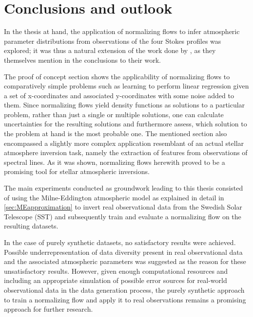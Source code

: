 \documentclass[a4paper,11pt]{report}
\def\lk#1{{\color{black}{#1}}}
\begin{document}
\FloatBarrier
\chapter{Conclusions and outlook}
\lk{In this last chapter, the main conclusions from the beforehand discussed material shall be recalled and summarized.}

In the thesis at hand, the application of normalizing flows to infer atmospheric parameter distributions from observations of the four Stokes profiles was explored; it was thus a natural extension of the work done by \cite{DiazBaso.2022}, as they themselves mention in the conclusions to their work.

The proof of concept section shows the applicability of normalizing flows to comparatively simple problems such as learning to perform linear regression given a set of x-coordinates and associated y-coordinates with some noise added to them. Since normalizing flows yield density functions as solutions to a particular problem, rather than just a single or multiple solutions, one can calculate uncertainties for the resulting solutions and furthermore assess, which solution to the problem at hand is the most probable one. The mentioned section also encompassed a slightly more complex application resemblant of an actual stellar atmosphere inversion task, namely the extraction of features from observations of spectral lines. As it was shown, normalizing flows herewith proved to be a promising tool for stellar atmospheric inversions.

The main experiments conducted as groundwork leading to this thesis consisted of using the Milne-Eddington atmospheric model as explained in detail in \cref{sec:MEapproximation} to invert real observational data from the Swedish Solar Telescope (SST) and subsequently train and evaluate a normalizing flow on the resulting datasets.

In the case of purely synthetic datasets, no satisfactory results were achieved. Possible underrepresentation of data diversity present in real observational data and the associated atmospheric parameters was suggested as the reason for these unsatisfactory results. However, given enough computational resources and including an appropriate simulation of possible error sources for real-world observational data in the data generation process, the purely synthetic approach to train a normalizing flow and apply it to real observations remains a promising approach for further research.
\end{document}
